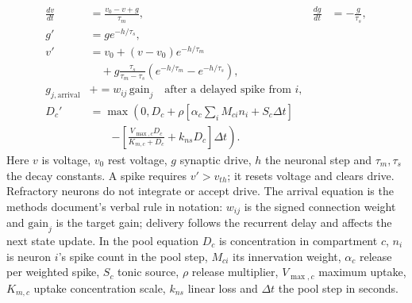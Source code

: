 \documentclass[11pt]{article}
\begin{document}
\begin{table}[htbp]
\caption{State updates. The equations show the continuous leak and the exact between-event step, delayed synaptic delivery, and the compartmental dopamine step.}
\small
\begin{minipage}{\linewidth}
\begin{align*}
\frac{dv}{dt}&=\frac{v_0-v+g}{\tau_m}, & \frac{dg}{dt}&=-\frac{g}{\tau_s},\\
g'&=g e^{-h/\tau_s},\\
v'&=v_0+(v-v_0)e^{-h/\tau_m}\\
 &\quad +g\frac{\tau_s}{\tau_m-\tau_s}(e^{-h/\tau_m}-e^{-h/\tau_s}),\\
g_{j,\mathrm{arrival}}&\mathrel{+}=w_{ij}\,\mathrm{gain}_j
 \quad\text{after a delayed spike from }i,\\
D_c'&=\max\!\left(0,D_c+\rho\left[\alpha_c\sum_i M_{ci}n_i+S_c\Delta t\right]\right.\\
&\qquad\left.-\left[\frac{V_{\max,c}D_c}{K_{m,c}+D_c}+k_{ns}D_c\right]\Delta t\right).
\end{align*}
Here $v$ is voltage, $v_0$ rest voltage, $g$ synaptic drive, $h$ the neuronal step and $\tau_m,\tau_s$ the decay constants. A spike requires $v'>v_{th}$; it resets voltage and clears drive. Refractory neurons do not integrate or accept drive. The arrival equation is the methods document's verbal rule in notation: $w_{ij}$ is the signed connection weight and $\mathrm{gain}_j$ is the target gain; delivery follows the recurrent delay and affects the next state update. In the pool equation $D_c$ is concentration in compartment $c$, $n_i$ is neuron $i$'s spike count in the pool step, $M_{ci}$ its innervation weight, $\alpha_c$ release per weighted spike, $S_c$ tonic source, $\rho$ release multiplier, $V_{\max,c}$ maximum uptake, $K_{m,c}$ uptake concentration scale, $k_{ns}$ linear loss and $\Delta t$ the pool step in seconds.
\end{minipage}
\end{table}
\end{document}
